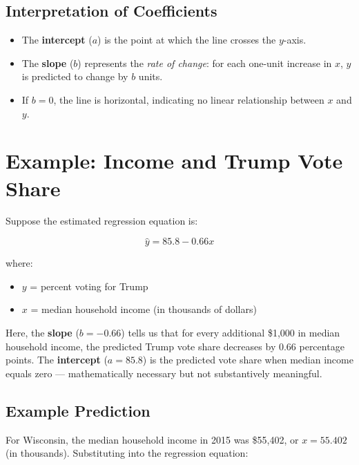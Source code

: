 \documentclass[
  letterpaper,
  DIV=11,
  numbers=noendperiod]{scrreprt}
\providecommand{\tightlist}{%
  \setlength{\itemsep}{0pt}\setlength{\parskip}{0pt}}
\begin{document}
\subsection{Interpretation of
Coefficients}\label{interpretation-of-coefficients}

\begin{itemize}
\tightlist
\item
  The \textbf{intercept} (\(a\)) is the point at which the line crosses
  the \(y\)-axis.\\
\item
  The \textbf{slope} (\(b\)) represents the \emph{rate of change}: for
  each one-unit increase in \(x\), \(y\) is predicted to change by \(b\)
  units.\\
\item
  If \(b = 0\), the line is horizontal, indicating no linear
  relationship between \(x\) and \(y\).
\end{itemize}

\section{Example: Income and Trump Vote
Share}\label{example-income-and-trump-vote-share}

Suppose the estimated regression equation is:

\[
\hat{y} = 85.8 - 0.66x
\]

where:

\begin{itemize}
\tightlist
\item
  \(y\) = percent voting for Trump\\
\item
  \(x\) = median household income (in thousands of dollars)
\end{itemize}

Here, the \textbf{slope} (\(b = -0.66\)) tells us that for every
additional \$1,000 in median household income, the predicted Trump vote
share decreases by 0.66 percentage points. The \textbf{intercept}
(\(a = 85.8\)) is the predicted vote share when median income equals
zero --- mathematically necessary but not substantively meaningful.

\subsection{Example Prediction}\label{example-prediction}

For Wisconsin, the median household income in 2015 was \$55,402, or
\(x = 55.402\) (in thousands). Substituting into the regression
equation:
\end{document}

